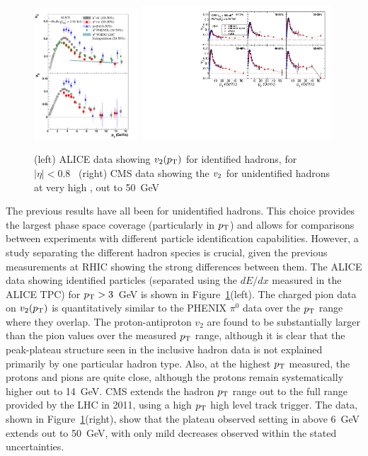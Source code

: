 \begin{figure}[!tb]
\begin{center}
\includegraphics[width=0.35\textwidth]{flowcorrelations_figs/alice_fig5_vn_pid.pdf}
\includegraphics[width=0.63\textwidth]{flowcorrelations_figs/v2_pt_ep_atlas_alice_eta0-1_band_v5.pdf}
\caption[]{(left) ALICE data showing $\mbox{$v_2$}(\mbox{$p_{\mathrm{T}}$})$ for identified
  hadrons, for $|\eta|<0.8$~\cite{Abelev:2012di} (right) CMS data
  showing the $\mbox{$v_2$}$ for unidentified hadrons at very high \pT, out
  to 50~GeV~\cite{Chatrchyan:2012xq}}
\label{fig:pas:fc:highpt}
\end{center}
\end{figure}
The previous results have all been for unidentified hadrons.  This choice provides the largest phase
space coverage (particularly in $\mbox{$p_{\mathrm{T}}$}$) and allows for comparisons between experiments with different particle
identification capabilities.  However, a study separating the different hadron species is crucial,
given the previous measurements at RHIC showing the strong differences between them.
The ALICE data showing identified particles (separated using the $dE/dx$ measured in the ALICE TPC) for $\mbox{$p_{\mathrm{T}}$}>3$~GeV
is shown in Figure~\ref{fig:pas:fc:highpt}(left).  The charged pion data on $v_2(\mbox{$p_{\mathrm{T}}$})$ is quantitatively similar to
the PHENIX $\pi^0$ data over the $\mbox{$p_{\mathrm{T}}$}$ range where they overlap.  The proton-antiproton $v_2$ are found to be
substantially larger than the pion values over the measured $\mbox{$p_{\mathrm{T}}$}$ range, although it is clear that the peak-plateau
structure seen in the inclusive hadron data is not explained primarily by one particular hadron type.
Also, at the highest $\mbox{$p_{\mathrm{T}}$}$ measured, the protons and pions are quite close, although the protons remain
systematically higher out to 14~GeV.
CMS extends the hadron $\mbox{$p_{\mathrm{T}}$}$ range out to the full range provided by the LHC in 2011, using a high $\mbox{$p_{\mathrm{T}}$}$
high level track trigger.  The data, shown in Figure~\ref{fig:pas:fc:highpt}(right), show that the
plateau observed setting in above 6~GeV extends out to 50~GeV, with only mild decreases observed within
the stated uncertainties.

